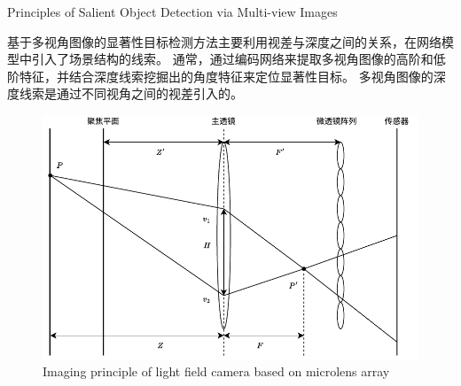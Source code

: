 



{Principles of Salient Object Detection via Multi-view Images}


基于多视角图像的显著性目标检测方法主要利用视差与深度之间的关系，在网络模型中引入了场景结构的线索。
通常，通过编码网络来提取多视角图像的高阶和低阶特征，并结合深度线索挖掘出的角度特征来定位显著性目标。
多视角图像的深度线索是通过不同视角之间的视差引入的。

\begin{figure}[b]
	\centering
	\includegraphics[width=0.90\linewidth]{figures/chapter2/microlens_array_imaging.drawio}
	{Imaging principle of light field camera based on microlens array}  
	\label{cpt2_fig8:multi_array}
\end{figure}

